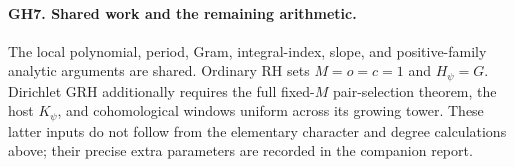 \paragraph{GH7. Shared work and the remaining arithmetic.}
The local polynomial, period, Gram, integral-index, slope, and positive-family
analytic arguments are shared.  Ordinary RH sets $M=o=c=1$ and
$H_\psi=G$.  Dirichlet GRH additionally requires the full fixed-$M$
pair-selection theorem, the host $K_\psi$, and cohomological windows
uniform across its growing tower.  These latter inputs do not follow
from the elementary character and degree calculations above; their
precise extra parameters are recorded in the companion report.
